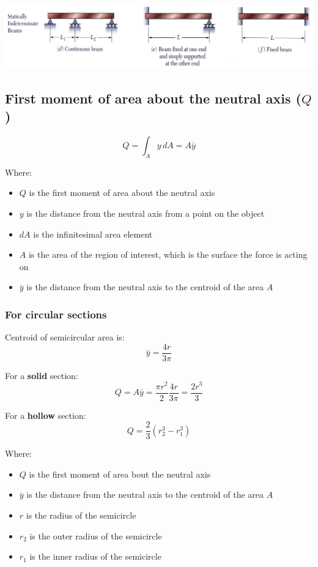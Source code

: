 \documentclass[11pt]{article}
\begin{document}
\begin{center}
\includegraphics[width=.9\linewidth]{./images/statically-indeterminate-beams.png}
\end{center}

\newpage
\subsection{First moment of area about the neutral axis (\(Q\))}
\label{sec:org7b4fc79}
\[Q = \int_{A} y \, dA = A \bar{y}\]

Where:
\begin{itemize}
\item \(Q\) is the first moment of area about the neutral axis
\item \(y\) is the distance from the neutral axis from a point on the object
\item \(dA\) is the infinitesimal area element
\item \(A\) is the area of the region of interest, which is the surface the force is acting on
\item \(\bar{y}\) is the distance from the neutral axis to the centroid of the area \(A\)
\end{itemize}
\subsubsection{For circular sections}
\label{sec:org3194b32}
Centroid of semicircular area is:
\[\bar{y} = \frac{4r}{3 \pi}\]

For a \textbf{solid} section:
\[Q = A \bar{y} = \frac{\pi r^2}{2} \frac{4r}{3 \pi} = \frac{2r^3}{3}\]

For a \textbf{hollow} section:
\[Q = \frac{2}{3} \left(r_2^3 - r_1^3 \right)\]

Where:
\begin{itemize}
\item \(Q\) is the first moment of area bout the neutral axis
\item \(\bar{y}\) is the distance from the neutral axis to the centroid of the area \(A\)
\item \(r\) is the radius of the semicircle
\item \(r_2\) is the outer radius of the semicircle
\item \(r_1\) is the inner radius of the semicircle
\end{itemize}
\end{document}
